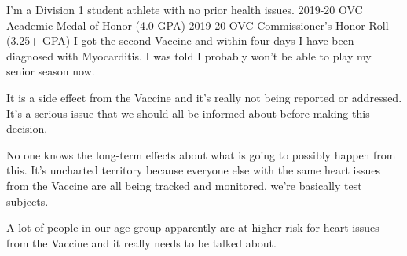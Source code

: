 I'm a Division 1 student athlete with no prior health issues. 2019-20 OVC
Academic Medal of Honor (4.0 GPA) 2019-20 OVC Commissioner's Honor Roll (3.25+
GPA) I got the second Vaccine and within four days I have been diagnosed with
Myocarditis. I was told I probably won't be able to play my senior season now.

It is a side effect from the Vaccine and it's really not being reported or
addressed. It's a serious issue that we should all be informed about before
making this decision.

No one knows the long-term effects about what is going to possibly happen from
this. It's uncharted territory because everyone else with the same heart issues
from the Vaccine are all being tracked and monitored, we're basically test
subjects.

A lot of people in our age group apparently are at higher risk for heart issues
from the Vaccine and it really needs to be talked about.

